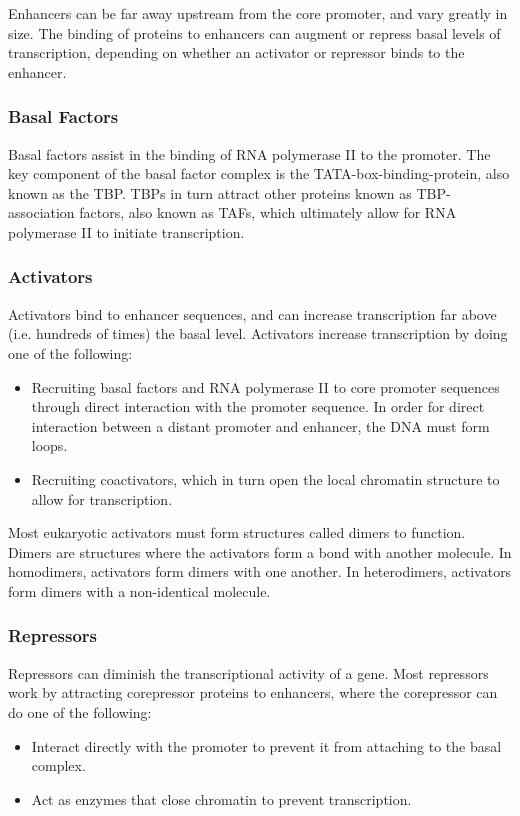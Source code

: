 \documentclass[12pt,titlepage]{article}
\begin{document}
        Enhancers can be far away upstream from the core promoter, and vary greatly in size. The binding of proteins to enhancers can augment or repress basal
        levels of transcription, depending on whether an activator or repressor binds to the enhancer.

      \subsubsection{Basal Factors}
        Basal factors assist in the binding of RNA polymerase II to the promoter. The key component of the basal factor complex is the TATA-box-binding-protein,
        also known as the TBP. TBPs in turn attract other proteins known as TBP-association factors, also known as TAFs, which ultimately allow for
        RNA polymerase II to initiate transcription.

      \subsubsection{Activators}
        Activators bind to enhancer sequences, and can increase transcription far above (i.e. hundreds of times) the basal level. Activators increase
        transcription by doing one of the following:
        \begin{itemize}
          \item Recruiting basal factors and RNA polymerase II to core promoter sequences through direct interaction with the promoter sequence. In order
            for direct interaction between a distant promoter and enhancer, the DNA must form loops.
          \item Recruiting coactivators, which in turn open the local chromatin structure to allow for transcription.
        \end{itemize}

        Most eukaryotic activators must form structures called dimers to function. Dimers are structures where the activators form a bond with another molecule.
        In homodimers, activators form dimers with one another. In heterodimers, activators form dimers with a non-identical molecule.

      \subsubsection{Repressors}
        Repressors can diminish the transcriptional activity of a gene. Most repressors work by attracting corepressor proteins to enhancers, where the corepressor
        can do one of the following:
        \begin{itemize}
          \item Interact directly with the promoter to prevent it from attaching to the basal complex.
          \item Act as enzymes that close chromatin to prevent transcription.
        \end{itemize}
\end{document}
